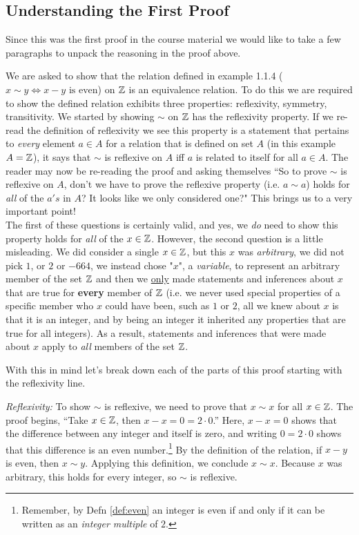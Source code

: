 \subsection{Understanding the First Proof}
Since this was the first proof in the course material we would like to take a few
paragraphs to unpack the reasoning in the proof above. \steezybreak

\noindent We are asked to show that the relation defined in example 1.1.4
($x\sim y \iff x-y \text{ is even}$) on ${\mathbb{Z}}$ is an equivalence relation. To do this we
are required to show the defined relation exhibits three properties: reflexivity,
symmetry, transitivity. We started by showing $\sim$ on ${\mathbb{Z}}$ has the reflexivity
property. If we re-read the definition of reflexivity we see this property is a
statement that pertains to \textit{every} element $a\in A$ for a relation that is
defined on set $A$ (in this example $A={\mathbb{Z}}$), it says that $\sim$ is reflexive on $A$
iff $a$ is related to itself for all $a\in A$. The reader may now be
re-reading the proof and asking themselves ``So to prove $\sim$ is reflexive on $A$,
don't we have to prove the reflexive property (i.e. $a\sim a$) holds for \textit{all}
of the $a's$ in $A$? It looks like we only considered one?" This brings us to a very
important point! \\

\noindent The first of these questions is certainly valid, and yes, we \textit{do} need
to show this property holds for \textit{all} of the $x\in {\mathbb{Z}}$. However, the second
question is a little misleading. We did consider a single $x\in {\mathbb{Z}}$, but this $x$ was
\textit{arbitrary}, we did not pick $1$, or $2$ or $-664$, we instead chose "$x$", a
\textit{variable}, to represent an arbitrary member of the set ${\mathbb{Z}}$ and then we
\underline{only} made statements and inferences about $x$ that are true for
\textbf{every} member of ${\mathbb{Z}}$ (i.e. we never used special properties of a specific
member who $x$ could have been, such as $1$ or $2$, all we knew about $x$ is that it is
an integer, and by being an integer it inherited any properties that are true for all
integers). As a result, statements and inferences that were made about $x$ apply to
\textit{all} members of the set ${\mathbb{Z}}$. \steezybreak

\noindent With this in mind let's break down each of the parts of this proof starting with the
reflexivity line. \steezybreak

\textit{Reflexivity:}
To show $\sim$ is reflexive, we need to prove that $x \sim x$ for all $x \in {\mathbb{Z}}$. The
proof begins, “Take $x \in {\mathbb{Z}}$, then $x - x = 0 = 2\cdot 0$.” Here, $x - x = 0$ shows
that the difference between any integer and itself is zero, and writing $0 = 2\cdot 0$
shows that this difference is an even number.\footnote{Remember, by Defn \ref{def:even}
an integer is even if and only if it can be written as an \textit{integer multiple} of
$2$.} By the definition of the relation, if $x - y$ is even, then $x \sim y$. Applying
this definition, we conclude $x \sim x$. Because $x$ was arbitrary, this holds for every
integer, so $\sim$ is reflexive. \steezybreak

